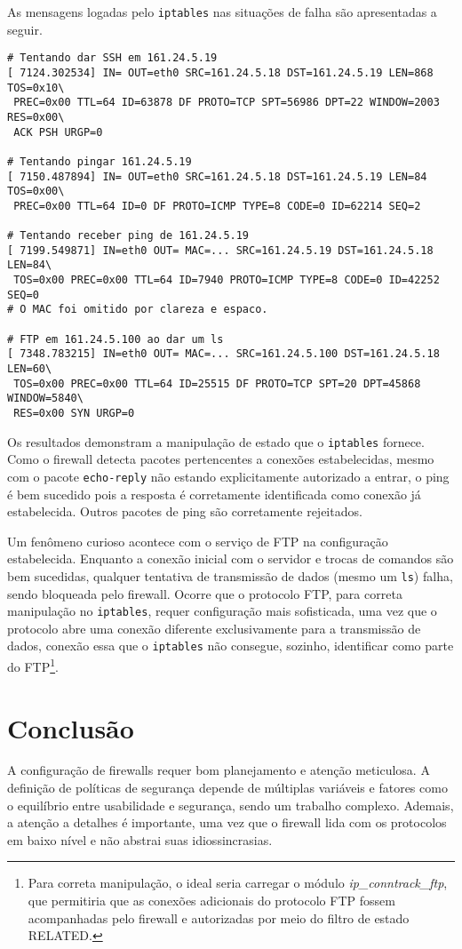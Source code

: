 \documentclass[a4paper,titlepage,11pt]{article}
\begin{document}
As mensagens logadas pelo \verb|iptables| nas situações de falha são apresentadas a seguir.
\begin{Verbatim}
# Tentando dar SSH em 161.24.5.19
[ 7124.302534] IN= OUT=eth0 SRC=161.24.5.18 DST=161.24.5.19 LEN=868 TOS=0x10\
 PREC=0x00 TTL=64 ID=63878 DF PROTO=TCP SPT=56986 DPT=22 WINDOW=2003 RES=0x00\
 ACK PSH URGP=0 

# Tentando pingar 161.24.5.19
[ 7150.487894] IN= OUT=eth0 SRC=161.24.5.18 DST=161.24.5.19 LEN=84 TOS=0x00\
 PREC=0x00 TTL=64 ID=0 DF PROTO=ICMP TYPE=8 CODE=0 ID=62214 SEQ=2 
 
# Tentando receber ping de 161.24.5.19
[ 7199.549871] IN=eth0 OUT= MAC=... SRC=161.24.5.19 DST=161.24.5.18 LEN=84\
 TOS=0x00 PREC=0x00 TTL=64 ID=7940 PROTO=ICMP TYPE=8 CODE=0 ID=42252 SEQ=0
# O MAC foi omitido por clareza e espaco.

# FTP em 161.24.5.100 ao dar um ls
[ 7348.783215] IN=eth0 OUT= MAC=... SRC=161.24.5.100 DST=161.24.5.18 LEN=60\
 TOS=0x00 PREC=0x00 TTL=64 ID=25515 DF PROTO=TCP SPT=20 DPT=45868 WINDOW=5840\
 RES=0x00 SYN URGP=0 
\end{Verbatim}

Os resultados demonstram a manipulação de estado que o \verb|iptables| fornece. Como o firewall detecta pacotes pertencentes a conexões estabelecidas, mesmo com o pacote \verb|echo-reply| não estando explicitamente autorizado a entrar, o ping é bem sucedido pois a resposta é corretamente identificada como conexão já estabelecida. Outros pacotes de ping são corretamente rejeitados.

Um fenômeno curioso acontece com o serviço de FTP na configuração estabelecida. Enquanto a conexão inicial com o servidor e trocas de comandos são bem sucedidas, qualquer tentativa de transmissão de dados (mesmo um \verb|ls|) falha, sendo bloqueada pelo firewall. Ocorre que o protocolo FTP, para correta manipulação no \verb|iptables|, requer configuração mais sofisticada, uma vez que o protocolo abre uma conexão diferente exclusivamente para a transmissão de dados, conexão essa que o \verb|iptables| não consegue, sozinho, identificar  como parte do FTP\footnote{Para correta manipulação, o ideal seria carregar o módulo {\em ip\_conntrack\_ftp}, que permitiria que as conexões adicionais do protocolo FTP fossem acompanhadas pelo firewall e autorizadas por meio do filtro de estado RELATED.}.

\enlargethispage{.5cm}
\section{Conclusão}

A configuração de firewalls requer bom planejamento e atenção meticulosa. A definição de políticas de segurança depende de múltiplas variáveis e fatores como o equilíbrio entre usabilidade e segurança, sendo um trabalho complexo. Ademais, a atenção a detalhes é importante, uma vez que o firewall lida com os protocolos em baixo nível e não abstrai suas idiossincrasias.
\end{document}
